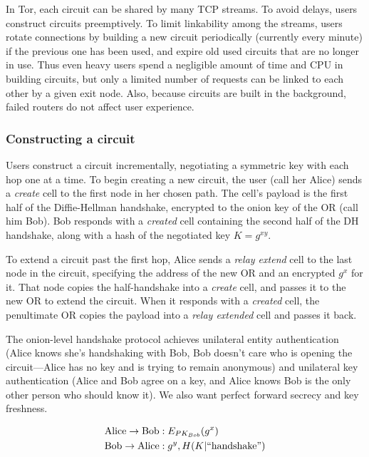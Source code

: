 \documentclass[times,10pt,twocolumn]{article}
\begin{document}
In Tor, each circuit can be shared by many TCP streams.  To avoid
delays, users construct circuits preemptively.  To limit linkability
among the streams, users rotate connections by building a new circuit
periodically (currently every minute) if the previous one has been
used, and expire old used circuits that are no longer in use. Thus
even heavy users spend a negligible amount of time and CPU in
building circuits, but only a limited number of requests can be linked
to each other by a given exit node. Also, because circuits are built
in the background, failed routers do not affect user experience.

\subsubsection{Constructing a circuit}

Users construct a circuit incrementally, negotiating a symmetric key with
each hop one at a time. To begin creating a new circuit, the user
(call her Alice) sends a \emph{create} cell to the first node in her
chosen path. The cell's payload is the first half of the
Diffie-Hellman handshake, encrypted to the onion key of the OR (call
him Bob). Bob responds with a \emph{created} cell containing the second
half of the DH handshake, along with a hash of the negotiated key
$K=g^{xy}$.

To extend a circuit past the first hop, Alice sends a \emph{relay extend}
cell to the last node in the circuit, specifying the address of the new
OR and an encrypted $g^x$ for it. That node copies the half-handshake
into a \emph{create} cell, and passes it to the new OR to extend the
circuit. When it responds with a \emph{created} cell, the penultimate OR
copies the payload into a \emph{relay extended} cell and passes it back.

The onion-level handshake protocol achieves unilateral entity
authentication (Alice knows she's handshaking with Bob, Bob doesn't
care who is opening the circuit---Alice has no key and is trying to
remain anonymous) and unilateral key authentication (Alice and Bob
agree on a key, and Alice knows Bob is the only other person who should
know it). We also want perfect forward secrecy and key freshness.

\begin{equation}
\begin{aligned}
\mathrm{Alice} \rightarrow \mathrm{Bob}&: E_{PK_{Bob}}(g^x) \\
\mathrm{Bob} \rightarrow \mathrm{Alice}&: g^y, H(K | \mathrm{``handshake"}) \\
\end{aligned}
\end{equation}
\end{document}

